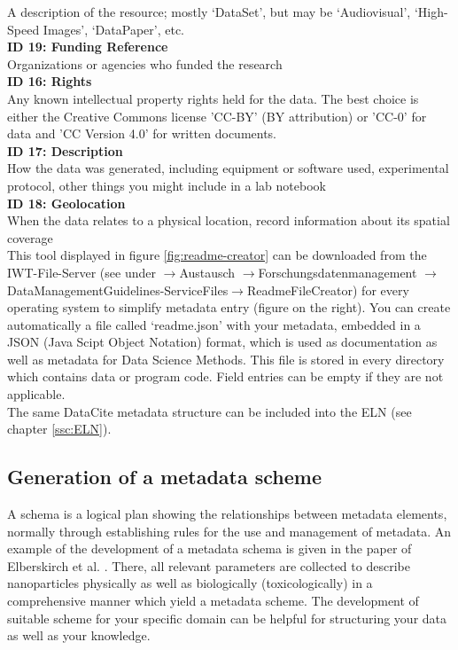 A description of the resource; mostly ‘DataSet’, but may be ‘Audiovisual’, ‘High-Speed Images’, ‘DataPaper’, etc. \\[6pt]
%
\textbf{ID 19: Funding Reference} \\
Organizations or agencies who funded the research \\[6pt]
%
\textbf{ID 16: Rights} \\
Any known intellectual property rights held for the data. The best choice is either the Creative Commons license 'CC-BY' (BY attribution) or 'CC-0' for data and 'CC Version 4.0' for written documents. \\[6pt]
%
\textbf{ID 17: Description} \\
How the data was generated, including equipment or software used, experimental protocol, other things you might include in a lab notebook \\[6pt]
%
\textbf{ID 18: Geolocation} \\
When the data relates to a physical location, record information about its spatial coverage \\[6pt]
%


This tool displayed in figure \ref{fig:readme-creator} can be downloaded from the IWT-File-Server (see under $\rightarrow$Austausch $\rightarrow$Forschungs\-datenmanagement $\rightarrow$DataManagementGuidelines-ServiceFiles\linebreak$\rightarrow$ReadmeFileCreator) for every operating system to simplify metadata entry (figure on the right). You can create automatically a file called ‘readme.json’ with your metadata, embedded in a JSON (Java Scipt Object Notation) format, which is used as documentation as well as metadata for Data Science Methods. This file is stored in every directory which contains data or program code. Field entries can be empty if they are not applicable. \\
%
The same DataCite metadata structure can be included into the ELN (see chapter \ref{ssc:ELN}).



\subsection{Generation of a metadata scheme}
A schema is a logical plan showing the relationships between metadata elements,
normally through establishing rules for the use and management of metadata. An example of the development of a metadata schema is given in the paper of Elberskirch et al. \cite{elberskirch:2022}. There, all relevant parameters are collected to describe nanoparticles physically as well as biologically (toxicologically) in a comprehensive manner which yield a metadata scheme.
The development of suitable scheme for your specific domain can be helpful for structuring your data as well as your knowledge.




